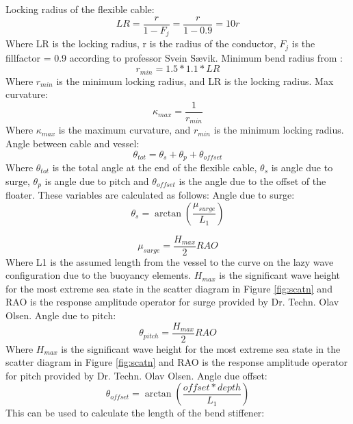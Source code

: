 \noindent Locking radius of the flexible cable:
\begin{equation}
    LR = \frac{r}{1-F_j} = \frac{r}{1-0.9} = 10r
\end{equation}
Where LR is the locking radius, r is the radius of the conductor, $F_j$ is the fillfactor = 0.9 according to professor Svein Sævik. \newline
\newline
Minimum bend radius from \cite{API2014}:
\begin{equation}
   r_{min}= 1.5 * 1.1 * LR
\end{equation}
Where $r_{min}$ is the minimum locking radius, and LR is the locking radius. 
\newline
\newline
Max curvature:
\begin{equation}
   \kappa_{max}= \frac{1}{r_{min}}
\end{equation}
Where $\kappa_{max}$ is the maximum curvature, and  $r_{min}$ is the minimum locking radius.
\newline
\newline
Angle between cable and vessel: 
\begin{equation}
   \theta_{tot} = \theta_{s} + \theta_{p} +   \theta_{offset}
\end{equation}
Where $\theta_{tot}$ is the total angle at the end of the flexible cable, $\theta_{s}$ is angle due to surge, $\theta_{p}$ is angle due to pitch and $\theta_{offset}$ is the angle due to the offset of the floater. These variables are calculated as follows:\newline
\newline 
Angle due to surge:
\begin{equation}
   \theta_{s} = \arctan{(\frac{\mu_{surge}}{L_{1}})}
\end{equation}

\begin{equation}
   \mu_{surge} = \frac{H_{max}}{2} RAO
\end{equation}
Where L{1} is the assumed length from the vessel to the curve on the lazy wave configuration due to the buoyancy elements.  $H_{max}$ is the significant wave height for the most extreme sea state in the scatter diagram in Figure \ref{fig:scatn} and RAO is the response amplitude operator for surge provided by Dr. Techn. Olav Olsen. \newline
\newline 
\noindent Angle due to pitch:
\begin{equation}
   \theta_{pitch} = \frac{H_{max}}{2} RAO
\end{equation}
Where $H_{max}$ is the significant wave height for the most extreme sea state in the scatter diagram in Figure \ref{fig:scatn} and RAO is the response amplitude operator for pitch provided by Dr. Techn. Olav Olsen. \newline
\newline
Angle due offset:
\begin{equation}
   \theta_{offset} = \arctan{(\frac{offset * depth}{L_1})}
\end{equation}
This can be used to calculate the length of the bend stiffener:


